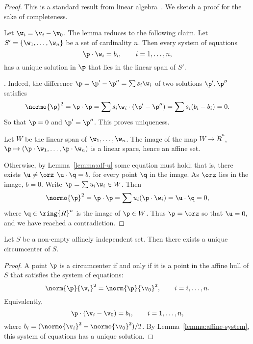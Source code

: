 \begin{proof} This is a standard result from linear algebra~\cite{XX}.
We sketch a proof for the sake of completeness.  

Let $\w_i = \v_i-\v_0$.  The lemma reduces to the following claim.
Let $S' = \{\w_1,\ldots,\w_n\}$ be a  set
of cardinality $n$.  Then every system of equations
\begin{displaymath} 
\p \cdot \w_i = b_i,\qquad i=1,\ldots,n,
\end{displaymath}
has a unique solution in $\p$ that lies in the linear span of $S'$.

. Indeed, the difference 
$\p = \p'-\p'' = \sum s_i \w_i$ of two solutions
$\p',\p''$ satisfies
\begin{displaymath} 
\normo{\p}^2=\p\cdot\p = \sum s_i \w_i \cdot (\p' - \p'') =
\sum s_i (b_i-b_i)= 0.
\end{displaymath}
So that $\p=0$ and $\p'=\p''$.  This proves uniqueness.

Let $W$ be the linear span of $\w_1,\ldots,\w_n$.  The image of the
map $W\to\ring{R}^n$, $\p\mapsto (\p\cdot\w_1,\ldots,\p\cdot\w_n)$ is
a linear space, hence an affine set.

Otherwise, by Lemma~\ref{lemma:aff-u} some equation must hold;
that is, there exists $\u\ne \orz$  $\u\cdot \q =b$, for every point $\q$ in the image.  
As $\orz$ lies in the image, $b=0$.  Write $\p = \sum u_i \w_i\in W$.
Then
\begin{displaymath} 
\normo{\p}^2 = \p\cdot\p = \sum u_i (\p \cdot \w_i) = \u\cdot \q = 0,
\end{displaymath} 
where $\q\in\ring{R}^n$ is the image of $\p\in W$.
Thus $\p=\orz$ so that $\u=0$, and we have reached a contradiction.
\end{proof}

\begin{lemma}[] 
Let $S$ be a non-empty affinely independent set.  Then there exists a unique
circumcenter of $S$.
\end{lemma}

\begin{proof} 
A point $\p$ is a circumcenter if and only if it is a point in the affine hull of $S$
that satisfies the system of equations:
\begin{displaymath} 
\norm{\p}{\v_i}^2 = \norm{\p}{\v_0}^2,\qquad i = i,\ldots,n.
\end{displaymath}
Equivalently,
\begin{displaymath} 
\p\cdot (\v_i-\v_0) = b_i,\qquad i=1,\ldots,n,
\end{displaymath}
where $b_i = (\normo{\v_i}^2-\normo{\v_0}^2)/2$.  By
Lemma~\ref{lemma:affine-system}, this system of equations has a unique
solution.
\end{proof}

